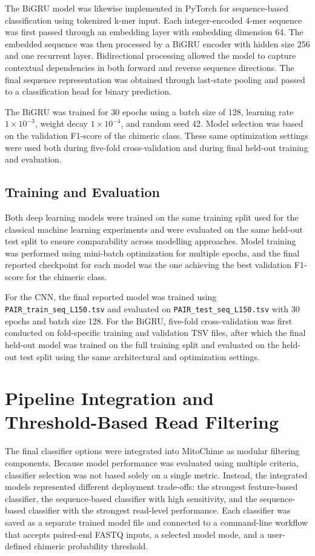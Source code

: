 The BiGRU model was likewise implemented in PyTorch for sequence-based classification using tokenized k-mer input. Each integer-encoded 4-mer sequence was first passed through an embedding layer with embedding dimension 64. The embedded sequence was then processed by a BiGRU encoder with hidden size 256 and one recurrent layer. Bidirectional processing allowed the model to capture contextual dependencies in both forward and reverse sequence directions. The final sequence representation was obtained through last-state pooling and passed to a classification head for binary prediction.

The BiGRU was trained for 30 epochs using a batch size of 128, learning rate \(1\times10^{-3}\), weight decay \(1\times10^{-4}\), and random seed 42. Model selection was based on the validation F1-score of the chimeric class. These same optimization settings were used both during five-fold cross-validation and during final held-out training and evaluation.

\subsection{Training and Evaluation}

Both deep learning models were trained on the same training split used for the classical machine learning experiments and were evaluated on the same held-out test split to ensure comparability across modelling approaches. Model training was performed using mini-batch optimization for multiple epochs, and the final reported checkpoint for each model was the one achieving the best validation F1-score for the chimeric class.

For the CNN, the final reported model was trained using \texttt{PAIR\_train\_seq\_L150.tsv} and evaluated on \texttt{PAIR\_test\_seq\_L150.tsv} with 30 epochs and batch size 128. For the BiGRU, five-fold cross-validation was first conducted on fold-specific training and validation TSV files, after which the final held-out model was trained on the full training split and evaluated on the held-out test split using the same architectural and optimization settings.

\section{Pipeline Integration and Threshold-Based Read Filtering}

The final classifier options were integrated into MitoChime as modular filtering components. Because model performance was evaluated using multiple criteria, classifier selection was not based solely on a single metric. Instead, the integrated models represented different deployment trade-offs: the strongest feature-based classifier, the sequence-based classifier with high sensitivity, and the sequence-based classifier with the strongest read-level performance. Each classifier was saved as a separate trained model file and connected to a command-line workflow that accepts paired-end FASTQ inputs, a selected model mode, and a user-defined chimeric probability threshold.


